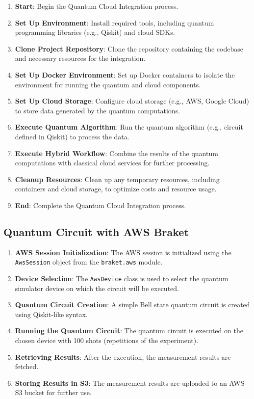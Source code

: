 \documentclass[12pt,a4paper]{article}
\begin{document}
\begin{enumerate}
    \item \textbf{Start}: Begin the Quantum Cloud Integration process.
    \item \textbf{Set Up Environment}: Install required tools, including quantum programming libraries (e.g., Qiskit) and cloud SDKs.
    \item \textbf{Clone Project Repository}: Clone the repository containing the codebase and necessary resources for the integration.
    \item \textbf{Set Up Docker Environment}: Set up Docker containers to isolate the environment for running the quantum and cloud components.
    \item \textbf{Set Up Cloud Storage}: Configure cloud storage (e.g., AWS, Google Cloud) to store data generated by the quantum computations.
    \item \textbf{Execute Quantum Algorithm}: Run the quantum algorithm (e.g., circuit defined in Qiskit) to process the data.
    \item \textbf{Execute Hybrid Workflow}: Combine the results of the quantum computations with classical cloud services for further processing.
    \item \textbf{Cleanup Resources}: Clean up any temporary resources, including containers and cloud storage, to optimize costs and resource usage.
    \item \textbf{End}: Complete the Quantum Cloud Integration process.
\end{enumerate}


\subsection{Quantum Circuit with AWS Braket}

\begin{enumerate}
    \item \textbf{AWS Session Initialization}: The AWS session is initialized using the \texttt{AwsSession} object from the \texttt{braket.aws} module.
    \item \textbf{Device Selection}: The \texttt{AwsDevice} class is used to select the quantum simulator device on which the circuit will be executed.
    \item \textbf{Quantum Circuit Creation}: A simple Bell state quantum circuit is created using Qiskit-like syntax.
    \item \textbf{Running the Quantum Circuit}: The quantum circuit is executed on the chosen device with 100 shots (repetitions of the experiment).
    \item \textbf{Retrieving Results}: After the execution, the measurement results are fetched.
    \item \textbf{Storing Results in S3}: The measurement results are uploaded to an AWS S3 bucket for further use.
\end{enumerate}
\end{document}
